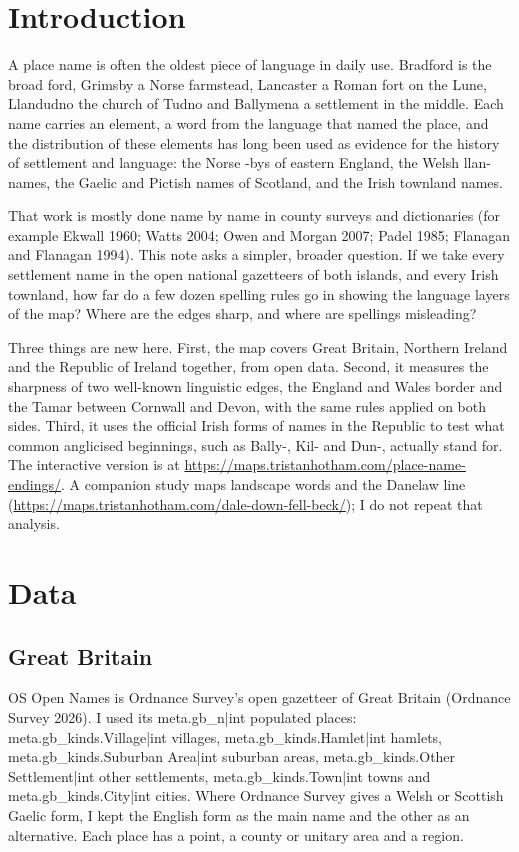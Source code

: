\documentclass[11pt,a4paper]{article}
\begin{document}
\section{Introduction}

A place name is often the oldest piece of language in daily use. Bradford is the broad ford, Grimsby a Norse farmstead, Lancaster a Roman fort on the Lune, Llandudno the church of Tudno and Ballymena a settlement in the middle. Each name carries an element, a word from the language that named the place, and the distribution of these elements has long been used as evidence for the history of settlement and language: the Norse -bys of eastern England, the Welsh llan- names, the Gaelic and Pictish names of Scotland, and the Irish townland names.

That work is mostly done name by name in county surveys and dictionaries (for example Ekwall 1960; Watts 2004; Owen and Morgan 2007; Padel 1985; Flanagan and Flanagan 1994). This note asks a simpler, broader question. If we take every settlement name in the open national gazetteers of both islands, and every Irish townland, how far do a few dozen spelling rules go in showing the language layers of the map? Where are the edges sharp, and where are spellings misleading?

Three things are new here. First, the map covers Great Britain, Northern Ireland and the Republic of Ireland together, from open data. Second, it measures the sharpness of two well-known linguistic edges, the England and Wales border and the Tamar between Cornwall and Devon, with the same rules applied on both sides. Third, it uses the official Irish forms of names in the Republic to test what common anglicised beginnings, such as Bally-, Kil- and Dun-, actually stand for. The interactive version is at \url{https://maps.tristanhotham.com/place-name-endings/}. A companion study maps landscape words and the Danelaw line (\url{https://maps.tristanhotham.com/dale-down-fell-beck/}); I do not repeat that analysis.

\section{Data}

\subsection{Great Britain}

OS Open Names is Ordnance Survey's open gazetteer of Great Britain (Ordnance Survey 2026). I used its {{meta.gb_n|int}} populated places: {{meta.gb_kinds.Village|int}} villages, {{meta.gb_kinds.Hamlet|int}} hamlets, {{meta.gb_kinds.Suburban Area|int}} suburban areas, {{meta.gb_kinds.Other Settlement|int}} other settlements, {{meta.gb_kinds.Town|int}} towns and {{meta.gb_kinds.City|int}} cities. Where Ordnance Survey gives a Welsh or Scottish Gaelic form, I kept the English form as the main name and the other as an alternative. Each place has a point, a county or unitary area and a region.
\end{document}
